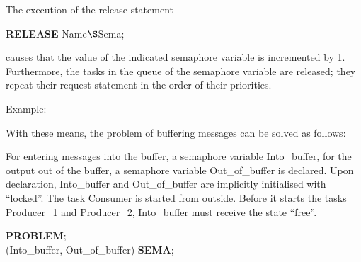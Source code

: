 The execution of the release statement

{\bf RELEASE} Name$\S $Sema;

causes that the value of the indicated semaphore variable is incremented
by 1. Furthermore, the tasks in the queue of the semaphore variable are
released; they repeat their request statement in the order of their
priorities.

Example:

With these means, the problem of buffering messages can be solved as
follows:

For entering messages into the buffer, a semaphore variable
Into\_buffer, for the output out of the buffer, a semaphore variable
Out\_of\_buffer is declared. Upon declaration, Into\_buffer and
Out\_of\_buffer are implicitly initialised with ``locked''. The task
Consumer is started from outside. Before it starts the tasks Producer\_1 and
Producer\_2, Into\_buffer must receive the state ``free''.

{\bf PROBLEM};\\
 (Into\_buffer, Out\_of\_buffer) {\bf SEMA};

